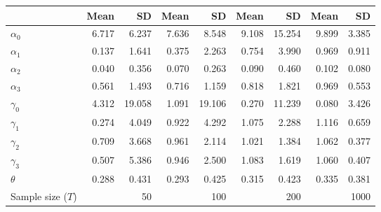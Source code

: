 
\begin{tabular}[t]{lrrrrrrrr}
\toprule
  & Mean & SD & Mean  & SD  & Mean   & SD   & Mean    & SD   \\
\midrule
$\alpha_{0}$ & 6.717 & 6.237 & 7.636 & 8.548 & 9.108 & 15.254 & 9.899 & 3.385\\
$\alpha_{1}$ & 0.137 & 1.641 & 0.375 & 2.263 & 0.754 & 3.990 & 0.969 & 0.911\\
$\alpha_{2}$ & 0.040 & 0.356 & 0.070 & 0.263 & 0.090 & 0.460 & 0.102 & 0.080\\
$\alpha_{3}$ & 0.561 & 1.493 & 0.716 & 1.159 & 0.818 & 1.821 & 0.969 & 0.553\\
$\gamma_{0}$ & 4.312 & 19.058 & 1.091 & 19.106 & 0.270 & 11.239 & 0.080 & 3.426\\
$\gamma_{1}$ & 0.274 & 4.049 & 0.922 & 4.292 & 1.075 & 2.288 & 1.116 & 0.659\\
$\gamma_{2}$ & 0.709 & 3.668 & 0.961 & 2.114 & 1.021 & 1.384 & 1.062 & 0.377\\
$\gamma_{3}$ & 0.507 & 5.386 & 0.946 & 2.500 & 1.083 & 1.619 & 1.060 & 0.407\\
$\theta$ & 0.288 & 0.431 & 0.293 & 0.425 & 0.315 & 0.423 & 0.335 & 0.381\\
Sample size ($T$) &  & 50 &  & 100 &  & 200 &  & 1000\\
\bottomrule
\end{tabular}
